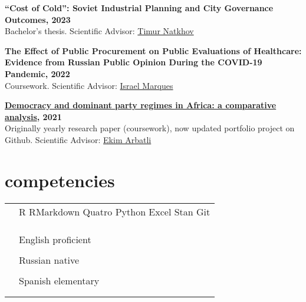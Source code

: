\documentclass[12pt]{article}
\newcommand{\entry}[4]{{{\textbf{#1}}} \hfill #3 \\ #2 \hfill #4}
\newcommand{\tableentry}[3]{\textsc{#1} & #2\expandafter\ifstrequal\expandafter{#3}{}{\\}{\\[6pt]}}
\begin{document}
\smallskip

\entry{``Cost of Cold'': Soviet Industrial Planning and City Governance Outcomes, 2023}{Bachelor's thesis. Scientific Advisor: \href{https://www.hse.ru/en/staff/natkhov}{Timur Natkhov}}{}{}

\smallskip

\entry{The Effect of Public Procurement on Public Evaluations of Healthcare: Evidence from Russian Public
Opinion During the COVID-19 Pandemic, 2022}{Coursework. Scientific Advisor: \href{https://israelmarques.com/}{Israel Marques}}{}{}

\smallskip

\entry{\href{https://github.com/sapolikanov/domparty}{Democracy and dominant party regimes in Africa: a comparative analysis}, 2021}{Originally yearly research paper (coursework), now updated portfolio project on Github. Scientific Advisor: \href{https://www.hse.ru/en/org/persons/61713365}{Ekim Arbatli}}{}{}

\section{competencies}
\begin{supertabular}{rl}
  \tableentry{\footnotesize\faCode}{R \textperiodcentered{} RMarkdown \textperiodcentered{} Quatro \textperiodcentered{} Python \textperiodcentered{} Excel \textperiodcentered{} Stan \textperiodcentered{} Git }{}
  \tableentry{}{}{}

  \tableentry{\footnotesize\faLanguage}{English \textperiodcentered{} proficient}{}
  \tableentry{}{Russian \textperiodcentered{} native}{}
  \tableentry{}{Spanish \textperiodcentered{} elementary}{}

\end{supertabular}
\end{document}

